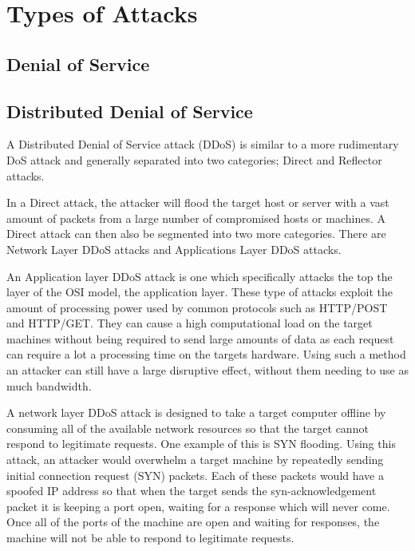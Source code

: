 \documentclass[conference, a4paper]{IEEEtran}
\begin{document}
\section{Types of Attacks}
\subsection{Denial of Service}
\subsection{Distributed Denial of Service}
    A Distributed Denial of Service attack (DDoS) is similar to a more rudimentary DoS attack and generally separated into two categories; Direct and Reflector attacks.

    In a Direct attack, the attacker will flood the target host or server with a vast amount of packets from a large number of compromised hosts or machines. 
    A Direct attack can then also be segmented into two more categories. There are Network Layer DDoS attacks and Applications Layer DDoS attacks.\cite{empirical_evaluation}
    
    An Application layer DDoS attack is one which specifically attacks the top the layer of the OSI model, the application layer.
    These type of attacks exploit the amount of processing power used by common protocols such as HTTP/POST and HTTP/GET.
    They can cause a high computational load on the target machines without being required to send large amounts of data as each request can require a lot a processing time on the targets hardware.
    Using such a method an attacker can still have a large disruptive effect, without them needing to use as much bandwidth.\cite{cloudflare_DDoS}

    A network layer DDoS attack is designed to take a target computer offline by consuming all of the available network resources so that the target cannot respond to legitimate requests.
    One example of this is SYN flooding. Using this attack, an attacker would overwhelm a target machine by repeatedly sending initial connection request (SYN) packets.
    Each of these packets would have a spoofed IP address so that when the target sends the syn-acknowledgement packet it is keeping a port open, waiting for a response which will never come.
    Once all of the ports of the machine are open and waiting for responses, the machine will not be able to respond to legitimate requests.\cite{cloudflare_syn_flood}
 
\end{document}
